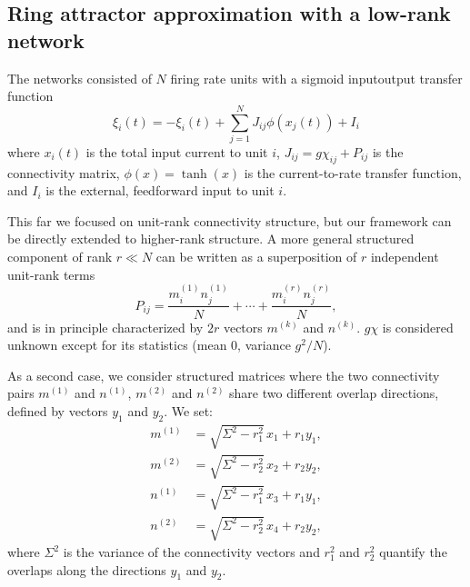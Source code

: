\documentclass{article} %
\newcounter{ct}
\theoremstyle{definition}
\theoremstyle{remark}
\begin{document}

%


\subsection{Ring attractor approximation with a low-rank network}\label{sec:supp:lowrank}
The networks consisted of \(N\) firing rate units with a sigmoid inputoutput transfer function \citep{mastrogiuseppe2018}
\begin{equation}
\xi_i(t) = - \xi_i(t) + \sum_{j=1}^{N} J_{ij}\phi(x_j(t)) + I_i
\label{eq:1}
\end{equation}
where \(x_i(t)\) is the total input current to unit \(i\),
\( J_{ij} = g\chi_{ij} + P_{ij}\) is the connectivity matrix,
\(\phi(x) = \tanh(x)\) is the current-to-rate transfer function, and \(I_i\) is the external, feedforward input to unit \(i\).

This far we focused on unit-rank connectivity structure, but our framework can be directly extended to higher-rank structure. A more general structured component of rank \(r\ll N\) can be written as a superposition of \(r\) independent unit-rank terms
\begin{equation}
P_{ij} = \frac{m^{(1)}_i n^{(1)}_j}{N} + \cdots + \frac{m^{(r)}_i n^{(r)}_j}{N},
\end{equation} and is in principle characterized by \(2r\) vectors \(m^{(k)}\) and \(n^{(k)}\).
\(g\chi\) is considered unknown except for its statistics (mean 0, variance \(g^2/N\)).

As a second case, we consider structured matrices where the two connectivity pairs \( m^{(1)} \) and \( n^{(1)} \), \( m^{(2)} \) and \( n^{(2)} \) share two different overlap directions, defined by vectors \( y_1 \) and \( y_2 \). We set:
\begin{align}
    m^{(1)} &= \sqrt{\Sigma^2 - r_1^2} \, x_1 + r_1 y_1, \\
    m^{(2)} &= \sqrt{\Sigma^2 - r_2^2} \, x_2 + r_2 y_2, \\
    n^{(1)} &= \sqrt{\Sigma^2 - r_1^2} \, x_3 + r_1 y_1, \\
    n^{(2)} &= \sqrt{\Sigma^2 - r_2^2} \, x_4 + r_2 y_2,
\end{align}
where \( \Sigma^2 \) is the variance of the connectivity vectors and \( r_1^2 \) and \( r_2^2 \) quantify the overlaps along the directions \( y_1 \) and \( y_2 \).
\end{document}
